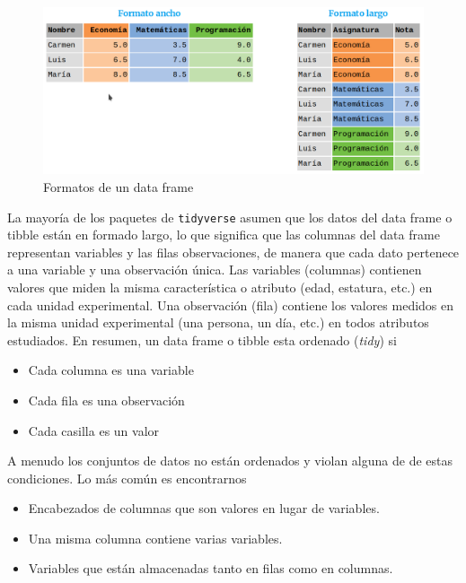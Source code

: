 \documentclass[
  a4paper,
]{scrreport}
\providecommand{\tightlist}{%
  \setlength{\itemsep}{0pt}\setlength{\parskip}{0pt}}\usepackage{longtable,booktabs,array}
\theoremstyle{definition}
\theoremstyle{definition}
\theoremstyle{remark}
\begin{document}
\begin{figure}

{\centering \includegraphics{./img/05-preprocesamiento/formatos-dataframe.png}

}

\caption{Formatos de un data frame}

\end{figure}

La mayoría de los paquetes de \texttt{tidyverse} asumen que los datos
del data frame o tibble están en formado largo, lo que significa que las
columnas del data frame representan variables y las filas observaciones,
de manera que cada dato pertenece a una variable y una observación
única. Las variables (columnas) contienen valores que miden la misma
característica o atributo (edad, estatura, etc.) en cada unidad
experimental. Una observación (fila) contiene los valores medidos en la
misma unidad experimental (una persona, un día, etc.) en todos atributos
estudiados. En resumen, un data frame o tibble esta ordenado
(\emph{tidy}) si

\begin{itemize}
\tightlist
\item
  Cada columna es una variable
\item
  Cada fila es una observación
\item
  Cada casilla es un valor
\end{itemize}

A menudo los conjuntos de datos no están ordenados y violan alguna de de
estas condiciones. Lo más común es encontrarnos

\begin{itemize}
\tightlist
\item
  Encabezados de columnas que son valores en lugar de variables.
\item
  Una misma columna contiene varias variables.
\item
  Variables que están almacenadas tanto en filas como en columnas.
\end{itemize}
\end{document}
